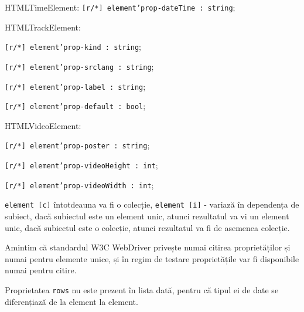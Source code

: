 \begin{icItems}
	\item HTMLTimeElement: \texttt{[r/*] element'prop-dateTime : string};
	
	\item HTMLTrackElement:
	\begin{icItems}
		\item \texttt{[r/*] element'prop-kind : string};
		\item \texttt{[r/*] element'prop-srclang : string};
		\item \texttt{[r/*] element'prop-label : string};
		\item \texttt{[r/*] element'prop-default : bool};
	\end{icItems}
	
	\item HTMLVideoElement:
	\begin{icItems}
		\item \texttt{[r/*] element'prop-poster : string};
		\item \texttt{[r/*] element'prop-videoHeight : int};
		\item \texttt{[r/*] element'prop-videoWidth : int};
	\end{icItems}
	
\end{icItems}

\texttt{element [c]} întotdeauna va fi o colecție, \texttt{element [i]} - variază în dependența de subiect, dacă subiectul este un element unic, atunci rezultatul va vi un element unic, dacă subiectul este o colecție, atunci rezultatul va fi de asemenea colecție. 

Amintim că standardul W3C WebDriver privește numai citirea proprietăților și numai pentru elemente unice, și în regim de testare proprietățile var fi disponibile numai pentru citire.

Proprietatea \texttt{rows} nu este prezent în lista dată, pentru că tipul ei de date se diferențiază de la element la element.

